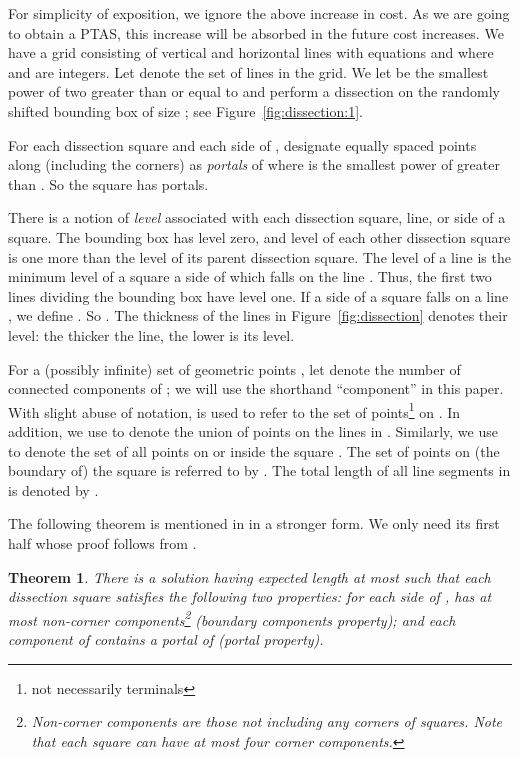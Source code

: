 \documentclass[extras,11pt]{article} \usepackage{fullpage}
\theoremstyle{mytheorem}
\newtheorem{theorem}{Theorem}
\begin{document}
For simplicity of exposition, we ignore the above increase in cost.
As we are going to  obtain a PTAS, this increase will be absorbed in the future cost increases.
We have a grid consisting of vertical and horizontal lines with equations  and  where  and  are integers.
Let  denote the set of lines in the grid. We let  be the smallest power of two greater than or equal to 
and perform a dissection on the randomly shifted bounding box of size ; see Figure~\ref{fig:dissection:1}.


For each dissection square  and each side  of ,
designate  equally spaced points along  (including the corners) as \emph{portals} of  where  is the smallest power of  greater than .
So the square  has  portals.


There is a notion of \emph{level} associated with each dissection square, line, or side of a square.
The bounding box has level zero, and level of each other dissection square is one more than the level of its parent dissection square.
The level of a line  is the minimum level of a square  a side of which falls on the line .
Thus, the first two lines dividing the bounding box have level one.
If a side  of a square  falls on a line , we define .
So .  The thickness of the lines in Figure~\ref{fig:dissection} denotes their level:
the thicker the line, the lower is its level.

For a (possibly infinite) set of geometric points , let  denote the number of connected components of ;
we will use the shorthand ``component'' in this paper.
With slight abuse of notation,  is used to refer to the set of points\footnote{not necessarily terminals} on .
In addition, we use  to denote the union of points on the lines in .
Similarly, we use  to denote the set of all points on or inside the square .
The set of points on (the boundary of) the square  is referred to by .
The total length of all line segments in  is denoted by .




The following theorem is mentioned in \cite{BKM08:euc-for} in a stronger form.
We only need its first half  whose proof follows from \cite{arora98:ptas}.
\begin{theorem}{\cite{BKM08:euc-for}}
\label{thm:twoprops}
There is a solution  having expected length at most  such that each dissection square  satisfies the following two properties:
for each side  of ,  has at most  non-corner components\footnote{Non-corner components are those not including any corners of squares.  Note that each square can have at most four corner components.} (\emph{boundary components property}); and
each component of  contains a portal of  (\emph{portal property}).
\end{theorem}
\end{document}
